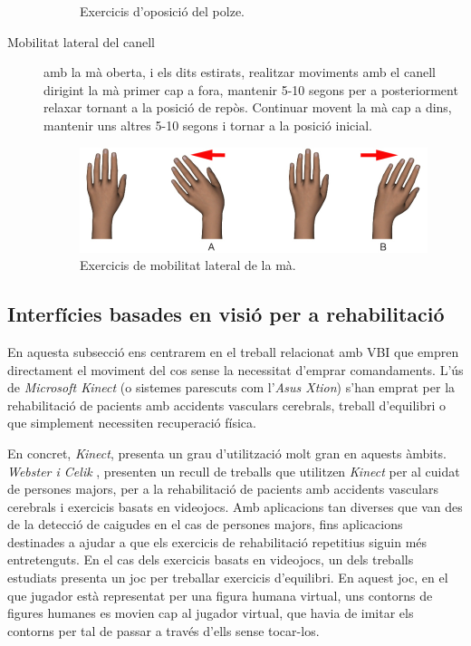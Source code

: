 \documentclass[12pt,a4paper,catalan]{article}
\begin{document}
\begin{description}
\begin{figure}[H]
			\centering
			\caption{Exercicis d'oposició del polze.}
		\end{figure}
		\item[Mobilitat lateral del canell] amb la mà oberta, i els dits estirats, realitzar moviments amb el canell dirigint la mà primer cap a fora, mantenir 5-10 segons per a posteriorment relaxar tornant a la posició de repòs. Continuar movent la mà cap a dins, mantenir uns altres 5-10 segons i tornar a la posició inicial.
		\begin{figure}[H]
			\includegraphics[width=\textwidth,keepaspectratio]{wrist-movility.jpg}
			\centering
			\caption{Exercicis de mobilitat lateral de la mà.}
		\end{figure}
	\end{description}
	\subsection{Interfícies basades en visió per a rehabilitació}
	En aquesta subsecció ens centrarem en el treball relacionat amb VBI que empren directament el moviment del cos sense la necessitat d'emprar comandaments.
	L'ús de \textit{Microsoft Kinect} (o sistemes parescuts com l'\textit{Asus Xtion}) s'han emprat per la rehabilitació de pacients amb accidents vasculars cerebrals, treball d'equilibri o que simplement necessiten recuperació física.
	
	En concret, \textit{Kinect}, presenta un grau d'utilització molt gran en aquests àmbits. \textit{Webster i Celik} \cite{webster-celik}, presenten un recull de treballs que utilitzen \textit{Kinect} per al cuidat de persones majors, per a la rehabilitació de pacients amb accidents vasculars cerebrals i exercicis basats en videojocs. Amb aplicacions tan diverses que van des de la detecció de caigudes en el cas de persones majors, fins aplicacions destinades a ajudar a que els exercicis de rehabilitació repetitius siguin més entretenguts. En el cas dels exercicis basats en videojocs, un dels treballs estudiats presenta un joc per treballar exercicis d'equilibri. En aquest joc, en el que jugador està representat per una figura humana virtual, uns contorns de figures humanes es movien cap al jugador virtual, que havia de imitar els contorns per tal de passar a través d'ells sense tocar-los.
	
\end{document}
